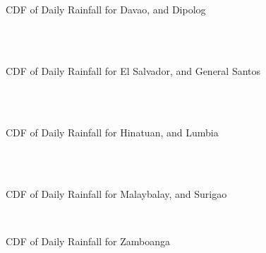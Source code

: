 \begin{figure}[H]
  \centering
  \\
  \\
  \caption{CDF of Daily Rainfall for Davao, and Dipolog}
  \label{fig:daily_without_threshold_appendix_gd_pt2}
\end{figure}

\begin{figure}[H]
  \centering
  \\
  \\
  \caption{CDF of Daily Rainfall for El Salvador, and General Santos}
  \label{fig:daily_without_threshold_appendix_gd_pt3}
\end{figure}

\begin{figure}[H]
  \centering
  \\
  \\
  \caption{CDF of Daily Rainfall for Hinatuan, and Lumbia}
  \label{fig:daily_without_threshold_appendix_gd_pt4}
\end{figure}

\begin{figure}[H]
  \centering
  \\
  \\
  \caption{CDF of Daily Rainfall for Malaybalay, and Surigao}
  \label{fig:daily_without_threshold_appendix_gd_pt5}
\end{figure}

\begin{figure}[H]
  \centering
  \\
  \caption{CDF of Daily Rainfall for Zamboanga}
  \label{fig:daily_without_threshold_appendix_gd_pt6}
\end{figure}

